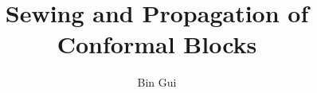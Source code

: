 \documentclass[12pt,a4paper,notitlepage]{article}
\title{Sewing and Propagation of Conformal Blocks}
\author{{\sc Bin Gui}
}
\date{}
\theoremstyle{definition}
\theoremstyle{plain}
\numberwithin{equation}{section}
\begin{document}
\sloppy %
	
	
	
	\maketitle
	
	
\newcommand\blfootnote[1]{%
	\begingroup
	\renewcommand\thefootnote{}\footnote{#1}%
	\addtocounter{footnote}{-1}%
	\endgroup
}





\tableofcontents




	
	
	
	

	
	

	
	
	
	
	
	
	
	
	

	
\newpage
\end{document}
